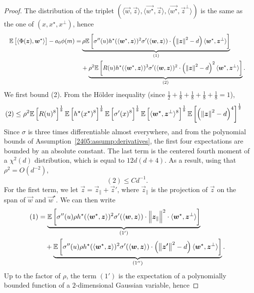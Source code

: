 \begin{proof}
  The distribution of the triplet $(\langle \vec{w}, \vec{z} \rangle, \langle \vec{w^\star}, \vec{z} \rangle, \langle \vec{w^\star}, \vec{z}^\bot \rangle)$ is the same as the one of $(x, x^\star, x^\bot)$, hence
  \[
    \resizebox{\linewidth}{!}{$\displaystyle
      \begin{aligned}
        \Ea{\langle \Phi(\vec{z}), \vec{w}^\star \rangle} - a_0\phi(m) = &\underbrace{\rho\Ea{\sigma''(u)  h^\star(\langle \vec{w}^\star, \vec{z} \rangle)^2 \sigma'(\langle \vec{w}, \vec{z} \rangle) \cdot  \left(\norm{\vec{z}}^2 - d \right) \langle \vec{w}^\star, \vec{z}^\bot \rangle}}_{(1)} \\
        &+ \underbrace{\rho^2 \Ea{R(u) h^\star(\langle \vec{w}^\star, \vec{z} \rangle)^3 \sigma'(\langle \vec{w}, \vec{z} \rangle)^2 \cdot  \left(\norm{\vec{z}}^2 - d \right)^2  \langle \vec{w}^\star, \vec{z}^\bot \rangle}}_{(2)}.
      \end{aligned}
    $}
  \]
  We first bound (2). From the Hölder inequality (since $\frac12 + \frac18 + \frac18 + \frac18 + \frac18 = 1$),
  \begin{align*}
    (2) &\leq \rho^2 \mathbb{E}\left[R(u)^8\right]^{\frac18}\mathbb{E}\left[h^\star(x^\star)^8\right]^{\frac18}\mathbb{E}\left[\sigma'(x)^8\right]^{\frac18}\mathbb{E}\left[\langle {\boldsymbol{w}}^\star, {\boldsymbol{z}}^\bot \rangle^8\right]^{\frac18}\mathbb{E}\left[\left(\left\lVert {\boldsymbol{z}}\right\rVert^2 - d \right)^4\right]^{\frac12}
  \end{align*}
  Since $\sigma$ is three times differentiable almost everywhere, and from the polynomial bounds of Assumption~\ref{2405:assump:derivatives}, the first four expectations are bounded by an absolute constant. The last term is the centered fourth moment of a $\chi^2(d)$ distribution, which is equal to $12d(d+4)$. As a result, using that $\rho^2 = O(d^{-2})$,
  \[ (2) \leq Cd^{-1}. \]
  For the first term, we let $\vec{z} = \vec{z}_\parallel + \vec{z}'$, where $\vec{z}_\parallel$ is the projection of $\vec{z}$ on the span of $\vec{w}$ and $\vec{w}^\star$. We can then write
  \begin{align*} 
    (1)& = \underbrace{\mathbb{E}\left[\sigma''(u) \rho  h^\star(\langle {\boldsymbol{w}}^\star, {\boldsymbol{z}} \rangle)^2 \sigma'(\langle {\boldsymbol{w}}, {\boldsymbol{z}} \rangle) \cdot  \left\lVert {\boldsymbol{z}}_\parallel\right\rVert^2 \cdot \langle {\boldsymbol{w}}^\star, {\boldsymbol{z}}^\bot \rangle\right]}_{(1')} \\
    &\quad+ \underbrace{\mathbb{E}\left[\sigma''(u) \rho  h^\star(\langle {\boldsymbol{w}}^\star, {\boldsymbol{z}} \rangle)^2 \sigma'(\langle {\boldsymbol{w}}, {\boldsymbol{z}} \rangle) \cdot  \left(\left\lVert {\boldsymbol{z'}}\right\rVert^2 - d \right) \langle {\boldsymbol{w}}^\star, {\boldsymbol{z}}^\bot \rangle\right]}_{(1'')}.
  \end{align*}
  Up to the factor of $\rho$, the term $(1')$ is the expectation of a polynomially bounded function of a $2$-dimensional Gaussian variable, hence

\end{proof}

